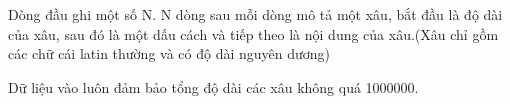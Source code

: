 Dòng đầu ghi một số N. N dòng sau mỗi dòng mô tả một xâu, bắt đầu là độ dài của xâu, sau đó là một dấu cách và tiếp theo là nội dung của xâu.(Xâu chỉ gồm các chữ cái latin thường và có độ dài nguyên dương)   


   Dữ liệu vào luôn đảm bảo tổng độ dài các xâu không quá 1000000.